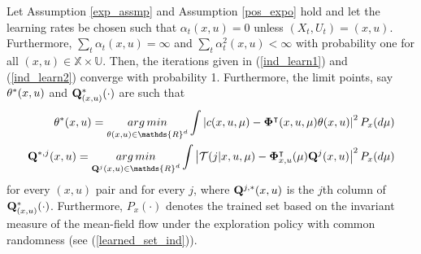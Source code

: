 \documentclass[twoside,11pt]{article}
\def\argmin{\mathop{\rm arg\, min}}
\begin{document}
\begin{corollary}\label{sgd_inf}
Let Assumption \ref{exp_assmp} and Assumption \ref{pos_expo} hold and let the learning rates be chosen such that $\alpha_t(x,u)=0$ unless $(X_t,U_t)=(x,u)$. Furthermore, $\sum_t \alpha_t(x,u)=\infty$ and $\sum_t \alpha_t^2(x,u)<\infty$ with probability one for all $(x,u)\in\mathds{X}\times\mathds{U}$.
Then, the iterations given in (\ref{ind_learn1}) and (\ref{ind_learn2}) converge with probability 1. Furthermore, the limit points, say ${\bf \theta}^*(x,u)$ and ${\bf Q}^*_{(x,u)}(\cdot)$ are such that 
\begin{align*}
{\bf \theta}^*(x,u)= \argmin_{\theta(x,u)\in \mathds{R}^d} \int \left| c(x,u,\mu) - {\bf \Phi}^\intercal(x,u,\mu) {\bf \theta}(x,u)\right|^2 P_{x}(d\mu)\\
{\bf Q}^{*,j}{(x,u)} = \argmin_{{\bf Q}^j{(x,u)} \in \mathds{R}^{d}}  \int \left|\mathcal{T}(j|x,u,\mu) - {\bf \Phi}_{x,u}^\intercal(\mu)   {\bf Q}^j{(x,u)} \right|^2 P_{x}(d\mu)
\end{align*}
for every $(x,u)$ pair and for every $j$, where ${\bf Q}^{j,*}{(x,u)}$ is the $j$th column of  ${\bf Q}^*_{(x,u)}(\cdot)$. Furthermore, $P_{x}(\cdot)$ denotes the trained set based on the invariant measure of the mean-field flow under the exploration policy with common randomness (see (\ref{learned_set_ind})).
\end{corollary}
\end{document}
